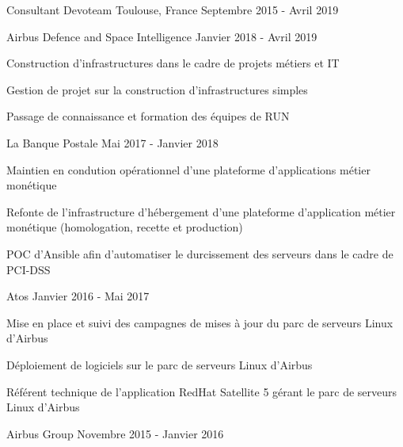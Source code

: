 \begin{cventries}
  \cventry
    {Consultant} %
    {Devoteam} %
    {Toulouse, France} %
    {Septembre 2015 - Avril 2019} %
    {
      \begin{cvsubentries}
        \cvsubentry
          {}
          {Airbus Defence and Space Intelligence}
          {Janvier 2018 - Avril 2019}
          {
            \begin{cvitems} %
              \item {Construction d'infrastructures dans le cadre de projets métiers et IT}
              \item {Gestion de projet sur la construction d'infrastructures simples}
              \item {Passage de connaissance et formation des équipes de RUN}
            \end{cvitems}
          }
        \cvsubentry
          {}
          {La Banque Postale}
          {Mai 2017 - Janvier 2018}
          {
            \begin{cvitems} %
              \item {Maintien en condution opérationnel d'une plateforme d'applications métier monétique}
              \item {Refonte de l'infrastructure d'hébergement d'une plateforme d'application métier monétique (homologation, recette et production)}
              \item {POC d'Ansible afin d'automatiser le durcissement des serveurs dans le cadre de PCI-DSS}
            \end{cvitems}
          }
        \cvsubentry
          {}
          {Atos}
          {Janvier 2016 - Mai 2017}
          {
            \begin{cvitems} %
              \item {Mise en place et suivi des campagnes de mises à jour du parc de serveurs Linux d'Airbus}
              \item {Déploiement de logiciels sur le parc de serveurs Linux d'Airbus}
              \item {Référent technique de l'application RedHat Satellite 5 gérant le parc de serveurs Linux d'Airbus}
            \end{cvitems}
          }
        \cvsubentry
          {}
          {Airbus Group}
          {Novembre 2015 - Janvier 2016}
          {
            \begin{cvitems} %

\end{cvitems}}
\end{cvsubentries}}
\end{cventries}
